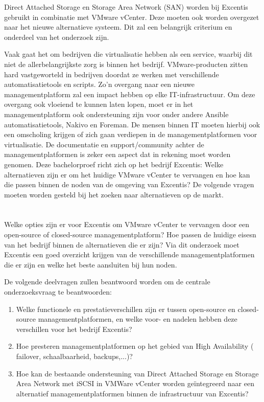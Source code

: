 Direct Attached Storage en Storage Area Network (SAN) worden bij Excentis gebruikt in combinatie met VMware vCenter.
Deze moeten ook worden overgezet naar het nieuwe alternatieve systeem. Dit zal een belangrijk criterium en onderdeel van het onderzoek zijn.

Vaak gaat het om bedrijven die virtualisatie hebben als een service, waarbij dit niet de allerbelangrijkste zorg is binnen het bedrijf.
VMware-producten zitten hard vastgeworteld in bedrijven doordat ze werken met verschillende automatisatietools en scripts. Zo'n overgang naar een nieuwe managementplatform zal een impact hebben op elke IT-infrastructuur.
Om deze overgang ook vloeiend te kunnen laten lopen, moet er in het managementplatform ook ondersteuning zijn voor onder andere Ansible automatisatietools, Nakivo en Foreman.
De mensen binnen IT moeten hierbij ook een omscholing krijgen of zich gaan verdiepen in de managementplatformen  voor virtualisatie. De documentatie en support/community achter de managementplatformen is zeker een aspect dat in rekening moet worden genomen.
Deze bachelorproef richt zich op het bedrijf Excentis: Welke alternatieven zijn er om het huidige VMware vCenter te vervangen en hoe kan die passen binnen de noden van de omgeving van Excentis?
De volgende vragen moeten worden gesteld bij het zoeken naar alternatieven op de markt.


\section{}%
\label{sec:onderzoeksvraag}

Welke opties zijn er voor Excentis om VMware vCenter te vervangen door een open-source of closed-source managementplatform? Hoe passen de huidige eisesn van het bedrijf binnen de alternatieven die er zijn?
Via dit onderzoek moet Excentis een goed overzicht krijgen van de verschillende managementplatformen die er zijn en welke het beste aansluiten bij hun noden.

De volgende deelvragen zullen beantwoord worden om de centrale onderzoeksvraag te beantwoorden:
\begin{enumerate}
  \item Welke functionele en prestatieverschillen zijn er tussen open-source en closed-source managementplatformen, en welke voor- en nadelen hebben deze verschillen voor het bedrijf Excentis?
  \item Hoe presteren managementplatformen op het gebied van High Availability ( failover, \newline schaalbaarheid, backups,...)?
  \item Hoe kan de bestaande ondersteuning van Direct Attached Storage en Storage Area Network met iSCSI in VMWare vCenter worden geïntegreerd naar een alternatief managementplatformen binnen de infrastructuur van Excentis?
  \end{enumerate}
\newpage
